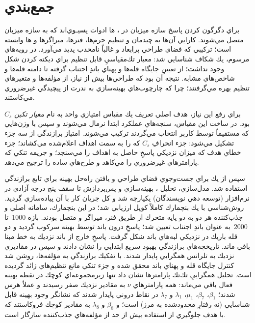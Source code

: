\section{جمع‌بندي}

\noindent براي دگرگون كردن پاسخ سازه ميزبان در ، ‌ها ادوات پسيـوي‌اند كه به سازه ميزبان متصل مي‌شوند. كارايي آن‌ها به چيدمان و تنظيم جرم‌ها، فنرها، ميراگرها و ‌ها وابسته است؛ تركيبي كه فضاي طراحي پرابعاد و غالباً نا‌محدب پديد مي‌آورد. در رويه‌هاي مرسوم، يك شكاف شناسايي شد: معيار تك‌مقياسيِ قابل تنظيم براي ديكته كردن شكل  وجود نداشت؛ از تعيينِ جايگاه قله‌ها و پهناي باندِ اجتناب گرفته تا دامنه قله‌ها و شاخص‌هاي مشابه. نتيجه آن بود كه طراحي‌ها بيش از نياز، از مؤلفه‌ها و متغيرهاي تنظيم بهره مي‌گرفتند؛ چرا كه چارچوب‌هاي بهينه‌سازي به ندرت از پيچيدگي غيرضروري مي‌كاستند.

\noindent براي رفع اين نياز، هدف اصلي تعريف يك مقياس امتيازي واحد به نام \emph{معيار تكين} \(C_s\) بود. در ساخت اين مقياس، سنجه‌هاي عملكرد ابتدا نرمال مي‌شوند و سپس با وزن‌هايي كه مستقيماً توسط كاربر انتخاب مي‌گردند تركيب مي‌شوند. امتياز برازندگي از سه جزء تشكيل مي‌شود: جزء انحرافِ \(C_s\) كه  را به سمت اهداف اعلام‌شده مي‌كشاند؛ جزء خطاي هدف كه ميزان نزديكي پاسخِ حاصل به اهداف را مي‌سنجد؛ و جريمه تنكي كه پارامترهاي غيرضروري را مي‌كاهد و طرح‌هاي ساده را ترجيح مي‌دهد.

\noindent سپس از يك  براي جست‌وجوي فضاي طراحي و يافتن راه‌حل بهينه براي تابع برازندگي استفاده شد. مدل‌سازي، تحليل ، بهينه‌سازي و پس‌پردازش تا سقف پنج درجه آزادي در نرم‌افزار  (توسعه دهي نويسندگان) يكپارچه شد و كل جريان كار با آن پياده‌سازي گرديد. روش‌شناسي با يك بنچمارك كاملاً كوپل  ارزيابي شد؛ در اين بنچمارك، سامانه اصلي و جذب‌كننده هر دو به دو پايه متحرك از طريق فنر، ميراگر و  متصل بودند. بازه \(1000\)\, تا \(2000\)\, به عنوان باندِ اجتناب تعيين شد؛ پاسخِ درون باند توسط  بهينه سركوب گرديد و دو قله باريك در نزديكي لبه‌هاي باند شكل گرفت. پاسخِ خارج از باند نزديك به خط مبنا باقي ماند. تاريخچه‌هاي برازندگي بهبود سريع ابتدايي را نشان دادند و سپس در مقاديري نزديك به تلرانس همگرايي پايدار شدند. با تفكيك برازندگي به مؤلفه‌ها، روشن شد كنترل جايگاه قله و پهناي باند محقق شده و جزء تنكي مانع تنظيم‌هاي زائد گرديده است. تحليل همگراييِ تك‌تك پارامترها نشان داد تنها زيرمجموعه‌اي كوچك در نقطه بهينه فعال باقي مي‌ماند: همه پارامترهاي \(\nu\) به مقادير نزديك صفر رسيدند و عملاً هرس شدند؛ \(\beta_1\)، \(\beta_7\)، \(\mu_1\)، \(\lambda_1\) و \(\lambda_7\) در نقاط دروني پايدار شدند كه نشانگر وجود بهينه قابل شناسايي (نه رفتارِ محدودشده به مرز) است؛ و \(\beta_8\) و \(\lambda_8\) به مقادير كوچك فروكاستند كه با هدف جلوگيري از استفاده بيش از حد از مؤلفه‌هاي جذب‌كننده سازگار است.

